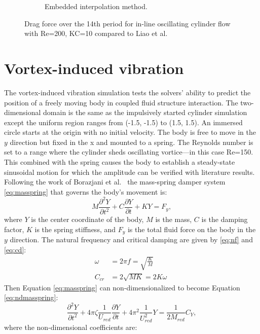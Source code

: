 \begin{figure}[!htb]
\begin{subfigure}{0.4\textwidth}
		\caption{Embedded interpolation method.}
	\end{subfigure}
	\caption{Drag force over the 14th period for in-line oscillating cylinder flow with Re=200, KC=10 compared to Liao et al.~\cite{liao2010simulating}}
	\label{fig:KC 10}
\end{figure}
\section{Vortex-induced vibration}
The vortex-induced vibration simulation tests the solvers' ability to predict the position of a freely moving body in coupled fluid structure interaction. 
The two-dimensional domain is the same as the impulsively started cylinder simulation except the uniform region ranges from (-1.5, -1.5) to (1.5, 1.5). 
An immersed circle starts at the origin with no initial velocity. 
The body is free to move in the $y$ direction but fixed in the x and mounted to a spring. 
The Reynolds number is set to a range where the cylinder sheds oscillating vortice---in this case Re=150. 
This combined with the spring causes the body to establish a steady-state sinusoidal motion for which the amplitude can be verified with literature results. 
Following the work of Borazjani et al.~\cite{borazjani2008curvilinear} the mass-spring damper system \eqref{eq:masspring} that governs the body's movement is:
\begin{equation}
M\frac{\partial^2Y}{\partial t^2}+C\frac{\partial Y}{\partial t}+KY=F_y, \label{eq:masspring}
\end{equation}
where $Y$ is the center coordinate of the body, $M$ is the mass, $C$ is the damping factor, $K$ is the spring stiffness, and $F_y$ is the total fluid force on the body in the $y$ direction. 
The natural frequency and critical damping are given by \eqref{eq:nf} and \eqref{eq:cd}: 
\begin{align}
\omega &=2\pi f =\sqrt{\frac{K}{M}}\label{eq:nf}\\
C_{cr}&=2\sqrt{MK}=2K\omega \; \label{eq:cd}
\end{align}
Then Equation \eqref{eq:masspring} can non-dimensionalized to become Equation \eqref{eq:ndmasspring}:
\begin{equation}
\frac{\partial^2 Y}{\partial t^2}+4\pi \zeta\frac{1}{U_{red}}\frac{\partial Y}{\partial t}+4\pi^2\frac{1}{U_{red}^2}Y=\frac{1}{2M_{red}}C_Y,\label{eq:ndmasspring}
\end{equation}
where the non-dimensional coefficients are:\newline
